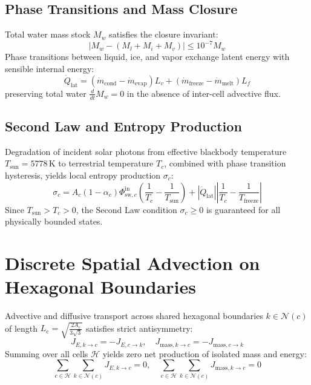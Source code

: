 \documentclass[10pt,twocolumn,a4paper]{article}
\begin{document}
\subsection{Phase Transitions and Mass Closure}
Total water mass stock $M_w$ satisfies the closure invariant:
\begin{equation}
|M_w - (M_l + M_i + M_v)| \le 10^{-7} M_w
\end{equation}
Phase transitions between liquid, ice, and vapor exchange latent energy with sensible internal energy:
\begin{equation}
\dot{Q}_{\mathrm{lat}} = (\dot{m}_{\mathrm{cond}} - \dot{m}_{\mathrm{evap}}) L_v + (\dot{m}_{\mathrm{freeze}} - \dot{m}_{\mathrm{melt}}) L_f
\end{equation}
preserving total water $\frac{d}{dt} M_w = 0$ in the absence of inter-cell advective flux.

\subsection{Second Law and Entropy Production}
Degradation of incident solar photons from effective blackbody temperature $T_{\mathrm{sun}} = 5778\,\mathrm{K}$ to terrestrial temperature $T_c$, combined with phase transition hysteresis, yields local entropy production $\sigma_c$:
\begin{equation}
\sigma_c = A_c (1 - \alpha_c) \Phi_{\mathrm{sw}, c}^{\mathrm{in}} \left( \frac{1}{T_c} - \frac{1}{T_{\mathrm{sun}}} \right) + \left| \dot{Q}_{\mathrm{lat}} \right| \left| \frac{1}{T_c} - \frac{1}{T_{\mathrm{freeze}}} \right|
\end{equation}
Since $T_{\mathrm{sun}} > T_c > 0$, the Second Law condition $\sigma_c \ge 0$ is guaranteed for all physically bounded states.

\section{Discrete Spatial Advection on Hexagonal Boundaries}
Advective and diffusive transport across shared hexagonal boundaries $k \in \mathcal{N}(c)$ of length $L_e = \sqrt{\frac{2 A_c}{3 \sqrt{3}}}$ satisfies strict antisymmetry:
\begin{equation}
J_{E, k \to c} = - J_{E, c \to k}, \quad J_{\mathrm{mass}, k \to c} = - J_{\mathrm{mass}, c \to k}
\end{equation}
Summing over all cells $\mathcal{H}$ yields zero net production of isolated mass and energy:
\begin{equation}
\sum_{c \in \mathcal{H}} \sum_{k \in \mathcal{N}(c)} J_{E, k \to c} = 0, \quad \sum_{c \in \mathcal{H}} \sum_{k \in \mathcal{N}(c)} J_{\mathrm{mass}, k \to c} = 0
\end{equation}
\end{document}

